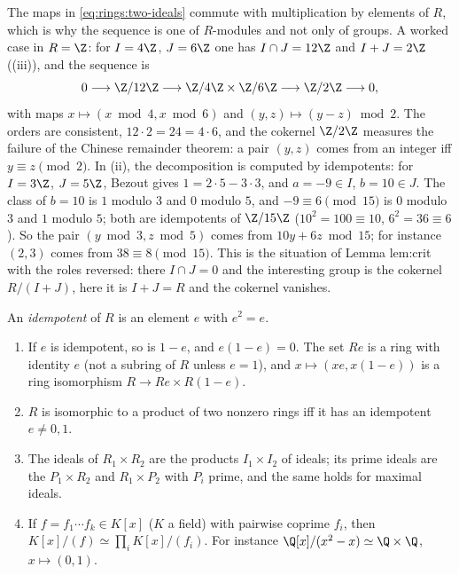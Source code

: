 The maps in \eqref{eq:rings:two-ideals} commute with multiplication by elements of $R$, which is why the sequence is one of $R$-modules and not
only of groups. A worked case in $R=\Z$: for $I=4\Z$, $J=6\Z$ one has $I\cap J=12\Z$ and $I+J=2\Z$ ((iii)), and the sequence is
\[
0\longrightarrow\Z/12\Z\longrightarrow\Z/4\Z\times\Z/6\Z\longrightarrow\Z/2\Z\longrightarrow0,
\]
with maps $x\mapsto(x\bmod4,x\bmod6)$ and $(y,z)\mapsto(y-z)\bmod2$.
The orders are consistent, $12\cdot2=24=4\cdot6$, and the cokernel $\Z/2\Z$ measures the failure of the Chinese remainder theorem: a pair
$(y,z)$ comes from an integer iff $y\equiv z\pmod2$. In (ii), the decomposition is computed by idempotents: for $I=3\Z$, $J=5\Z$, Bezout
gives $1=2\cdot5-3\cdot3$, and $a=-9\in I$, $b=10\in J$. The class of $b=10$ is $1$ modulo $3$ and $0$ modulo $5$, and $-9\equiv6\pmod{15}$ is $0$ modulo
$3$ and $1$ modulo $5$; both are idempotents of $\Z/15\Z$ ($10^2=100\equiv10$, $6^2=36\equiv6$). So the pair $(y\bmod3,z\bmod5)$ comes from
$10y+6z\bmod15$; for instance $(2,3)$ comes from $38\equiv8\pmod{15}$. This is the situation of Lemma lem:crit with the roles reversed: there
$I\cap J=0$ and the interesting group is the cokernel $R/(I+J)$, here it is $I+J=R$ and the cokernel vanishes.

\begin{proposition}\label{prop:rings:idempotents}
An \emph{idempotent} of $R$ is an element $e$ with $e^2=e$.
\begin{enumerate}[label=(\roman*)]
\item If $e$ is idempotent, so is $1-e$, and $e(1-e)=0$. The set $Re$ is a ring with identity $e$ (not a subring of $R$ unless
$e=1$), and $x\mapsto(xe,x(1-e))$ is a ring isomorphism $R\to Re\times R(1-e)$.
\item $R$ is isomorphic to a product of two nonzero rings iff it has an idempotent $e\ne0,1$.
\item The ideals of $R_1\times R_2$ are the products $I_1\times I_2$ of ideals; its prime ideals are the $P_1\times R_2$ and $R_1\times P_2$ with
$P_i$ prime, and the same holds for maximal ideals.
\item If $f=f_1\cdots f_k\in K[x]$ ($K$ a field) with pairwise coprime $f_i$, then $K[x]/(f)\simeq\prod_iK[x]/(f_i)$. For instance
$\Q[x]/(x^2-x)\simeq\Q\times\Q$, $x\mapsto(0,1)$.
\end{enumerate}
\end{proposition}

